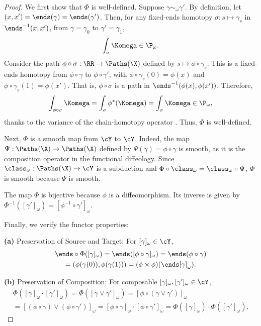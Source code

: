   \begin{proof}
    We first show that $\Phi$ is well-defined.
    Suppose $\gamma \sim_\omega \gamma'$.
    By definition,
    let $(x,x') = \ends(\gamma) = \ends(\gamma')$.
    Then,
    for any fixed-ends homotopy $\sigma : s \mapsto \gamma_s$ in $\ends^{-1}(x,x')$,
    from $\gamma = \gamma_0$ to $\gamma' = \gamma_1$,
    $$
      \int_\sigma \Komega \in \P_\omega.
      $$
    Consider the path $\phi \circ \sigma: \RR \to \Paths(\X)$ defined by $s \mapsto \phi \circ \gamma_s$.
    This is a fixed-ends homotopy from $\phi \circ \gamma$ to $\phi \circ \gamma'$,
    with $\phi\circ\gamma_s(0) = \phi(x)$ and $\phi\circ\gamma_s(1) = \phi(x')$.
    That is,
    $\phi \circ \sigma$ is a path in $\ends^{-1}(\phi(x),\phi(x'))$.
    Therefore,
    $$
      \int_{\phi \circ \sigma} \Komega = \int_\sigma \phi^*(\Komega) = \int_\sigma \Komega \in \P_\omega,
      $$
    thanks to the variance of the chain-homotopy operator \cite[]{PIZ13}.
    Thus,
    $\Phi$ is well-defined.
    
    Next,
    $\Phi$ is a smooth map from $\cY$ to $\cY$.
    Indeed,
    the map $\Psi: \Paths(\X) \to \Paths(\X)$ defined by $\Psi(\gamma) = \phi \circ \gamma$ is smooth,
    as it is the composition operator in the functional diffeology.
    Since $\class_\omega: \Paths(\X) \to \cY$ is a subduction and $\Phi \circ \class_\omega = \class_\omega \circ \Psi$,
    $\Phi$ is smooth because $\Psi$ is smooth.
    
    The map $\Phi$ is bijective because $\phi$ is a diffeomorphism.
    Its inverse is given by $\Phi^{-1}([\gamma']_\omega) = [\phi^{-1} \circ \gamma']_\omega$.
    
    Finally,
    we verify the functor properties:
    
    \textbf{(a)} Preservation of Source and Target:
    For $[\gamma]_\omega \in \cY$,
    \begin{multline*}
      \ends \circ \Phi([\gamma]_\omega)
      = \ends([\phi \circ \gamma]_\omega)
      = \ends(\phi \circ \gamma) \\
      = (\phi(\gamma(0)), \phi(\gamma(1)))
      = (\phi \times \phi)(\ends[\gamma]_\omega).
    \end{multline*}
    
    \textbf{(b)} Preservation of Composition:
    For composable $[\gamma]_\omega, [\gamma']_\omega \in \cY$,
    \begin{multline*}
      \Phi([\gamma]_\omega \cdot [\gamma']_\omega)
      = \Phi([\gamma \vee \gamma']_\omega)
      = [\phi \circ (\gamma \vee \gamma')]_\omega \\
      = [(\phi \circ \gamma) \vee (\phi \circ \gamma')]_\omega
      = [\phi \circ \gamma]_\omega \cdot [\phi \circ \gamma']_\omega
      = \Phi([\gamma]_\omega) \cdot \Phi([\gamma']_\omega).
    \end{multline*}
    

\end{proof}

